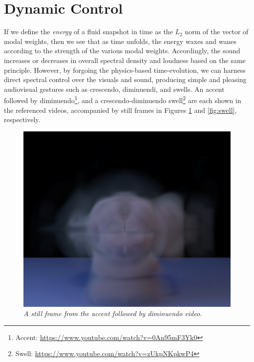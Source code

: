 \section{Dynamic Control}
If we define the {\em energy} of a fluid snapshot in time as the $L_2$ norm of the vector of modal weights, then we see that as time unfolds, the energy waxes and wanes according to the strength
of the various modal weights. Accordingly, the sound increases or decreases in overall spectral density and loudness based on the same principle. However, by forgoing the physics-based time-evolution,
we can harness direct spectral control over the visuals and sound, producing simple and pleasing audiovisual gestures such as crescendo, diminuendi, and swells. An accent followed by diminuendo\footnote{Accent: \url{https://www.youtube.com/watch?v=0An95mF3Yk0}}, and a crescendo-diminuendo swell\footnote{Swell: \url{https://www.youtube.com/watch?v=zUkpNKpkwP4}} are each shown in the referenced videos, accompanied by still frames in Figures \ref{fig:dim} and \ref{fig:swell}, respectively.

\begin{figure}[H]
	\centering
	\includegraphics[width=\textwidth]{chap6/figures/dim.png}
	\caption{\em A still frame from the accent followed by diminuendo video.}
\label{fig:dim}
\end{figure}

